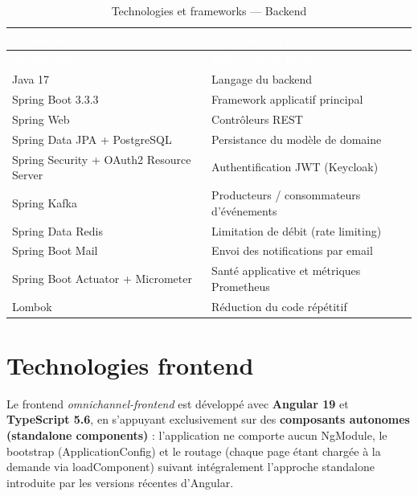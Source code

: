 \documentclass[12pt,a4paper]{report}
\begin{document}
\begin{longtable}{@{}>{\raggedright\arraybackslash}p{}p{}@{}}
\caption{Technologies et frameworks --- Backend}\\
\hline
\rowcolor{darkblue}\textcolor{white}{\textbf{Technologie}} & \textcolor{white}{\textbf{Rôle dans le projet}} \\
\hline
\endfirsthead
\hline
\rowcolor{darkblue}\textcolor{white}{\textbf{Technologie}} & \textcolor{white}{\textbf{Rôle dans le projet}} \\
\hline
\endhead
\hline
\endfoot
Java 17 & Langage du backend \\
\hline
Spring Boot 3.3.3 & Framework applicatif principal \\
\hline
Spring Web & Contrôleurs REST \\
\hline
Spring Data JPA + PostgreSQL & Persistance du modèle de domaine \\
\hline
Spring Security + OAuth2 Resource Server & Authentification JWT (Keycloak) \\
\hline
Spring Kafka & Producteurs / consommateurs d'événements \\
\hline
Spring Data Redis & Limitation de débit (rate limiting) \\
\hline
Spring Boot Mail & Envoi des notifications par email \\
\hline
Spring Boot Actuator + Micrometer & Santé applicative et métriques Prometheus \\
\hline
Lombok & Réduction du code répétitif \\
\hline
\end{longtable}

\section{Technologies frontend}

Le frontend \textit{omnichannel-frontend} est développé avec \textbf{Angular 19} et \textbf{TypeScript 5.6}, en s'appuyant exclusivement sur des \textbf{composants autonomes (standalone components)} : l'application ne comporte aucun NgModule, le bootstrap (ApplicationConfig) et le routage (chaque page étant chargée à la demande via loadComponent) suivant intégralement l'approche standalone introduite par les versions récentes d'Angular.
\end{document}

